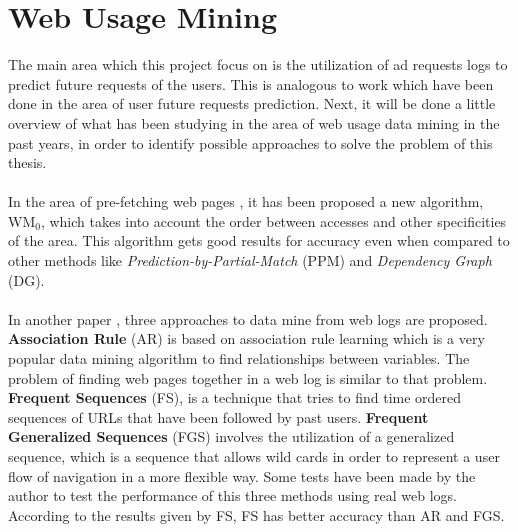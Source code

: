 \section{Web Usage Mining}\label{sec:network}

\nocite{UjwalaPatil}

The main area which this project focus on is the utilization of ad requests logs
to predict future requests of the users. This is analogous to work
which have been done in the area of user future requests prediction.
Next, it will be done a little overview of what has been studying in the area of web
usage data mining in the past years, in order to identify possible approaches
to solve the problem of this thesis.

\paragraph{}

In the area of pre-fetching web pages \cite{Nanopoulos01effectiveprediction}, it
has been proposed a new algorithm, WM\begin{math}_0\end{math}, which takes into
account the order between accesses and other specificities of the area. This
algorithm gets good results for accuracy even when compared to other methods
like \emph{Prediction-by-Partial-Match} (PPM) and \emph{Dependency Graph} (DG).

\paragraph{}

In another paper \cite{Gery:2003:EWU:956699.956716}, three approaches to
data mine from web logs are proposed. \textbf{Association Rule} (AR) is based on association rule
learning which is a very popular data mining algorithm to find relationships between
variables. The problem of finding web pages together in a web log is similar to
that problem. \textbf{Frequent Sequences} (FS), is a technique that tries to find time
ordered sequences of URLs that have been followed by past users.
\textbf{Frequent Generalized Sequences} (FGS) involves the utilization of a
generalized sequence, which is a
sequence that allows wild cards in order to represent a user flow of
navigation in a more flexible way. 
Some tests have been made by the author \cite{Gery:2003:EWU:956699.956716} to
test the performance of this three methods using real web logs. According to the
results given by FS, FS has better accuracy than AR and FGS.

